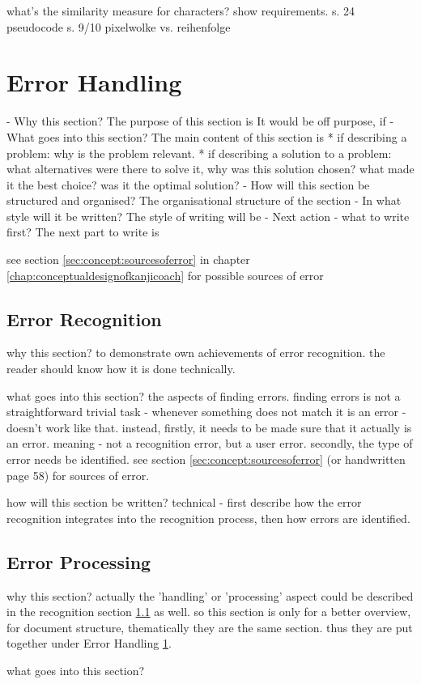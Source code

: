 what's the similarity measure for
characters?
show requirements.
s. 24 pseudocode
s. 9/10 pixelwolke vs. reihenfolge

\section{Error Handling}
\label{sec:hwre:errorhandling}

- Why this section? 
  The purpose of this section is 
  It would be off purpose, if 
- What goes into this section?
  The main content of this section is 
  * if describing a problem: why is the problem relevant.
  * if describing a solution to a problem: what alternatives were
    there to solve it, why was this solution chosen? 
    what made it the best choice? was it the optimal solution?
- How will this section be structured and organised?
  The organisational structure of the section 
- In what style will it be written?
  The style of writing will be 
- Next action - what to write first?
  The next part to write is



see section \ref{sec:concept:sourcesoferror} in chapter 
\ref{chap:conceptualdesignofkanjicoach} for possible sources of error

\subsection{Error Recognition}
\label{sec:hwre:errorrecognition}



why this section? to demonstrate own achievements of error recognition.
the reader should know how it is done technically.

what goes into this section? the aspects of finding errors. finding errors
is not a straightforward trivial task - whenever something does not match
it is an error - doesn't work like that. instead, 
firstly, it needs to be made sure that it actually is an error.
meaning - not a recognition error, but a user error.
secondly, the type of error needs be identified.
see section \ref{sec:concept:sourcesoferror} (or handwritten page 58)
for sources of error.

how will this section be written?
technical - first describe how the error recognition integrates into the
recognition process, then how errors are identified.


\subsection{Error Processing}
\label{sec:hwre:errorprocessing}




why this section? 
actually the 'handling' or 'processing' aspect could be 
described in the recognition section \ref{sec:hwre:errorrecognition} as well.
so this section is only for a better overview, for document structure, 
thematically they are the same section. thus they are put together under
Error Handling \ref{sec:hwre:errorhandling}.

what goes into this section?


